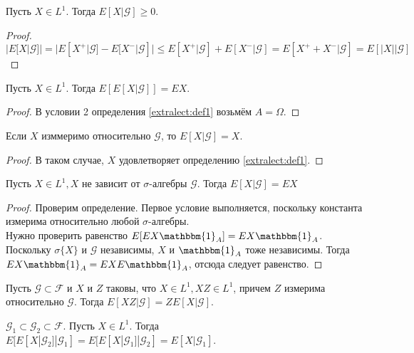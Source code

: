         \begin{lemma}
            Пусть $X\in L^1$. Тогда $E[X|\mathcal{G}]\ge0$.
        \end{lemma}
        \begin{proof}
           $|E[X|\mathcal{G}]| = |E[X^+|\mathcal{G}] - E[X^-|\mathcal{G}]|\leqslant E[X^+|\mathcal{G}] + E[X^-|\mathcal{G}] = E[X^+ + X^-|\mathcal{G}] = E[|X||\mathcal{G}]$
        \end{proof}

        \begin{lemma}
            Пусть $X\in L^1$. Тогда $E[E[X|\mathcal{G}]] = EX$.
        \end{lemma}
        \begin{proof}
           В условии 2 определения \ref{extralect:def1} возьмём $A=\Omega$.
        \end{proof}

        \begin{lemma}
            Если $X$ изммеримо относительно $\mathcal{G}$, то $E[X|\mathcal{G}]=X$.
        \end{lemma}
        \begin{proof}
           В таком случае, $X$ удовлетворяет определению \ref{extralect:def1}.
        \end{proof}

        \begin{lemma}
            Пусть $X\in L^1, X$ не зависит от $\sigma$-алгебры $\mathcal{G}$. Тогда $E[X|\mathcal{G}] = EX$
        \end{lemma}
        \begin{proof}
           Проверим определение. Первое условие выполняется, поскольку константа измерима относительно любой $\sigma$-алгебры.\\
           Нужно проверить равенство $E[EX\mathbbm{1}_{A}] = EX\mathbbm{1}_{A}$. Поскольку $\sigma\{X\}$ и $\mathcal{G}$ независимы, $X$ и $\mathbbm{1}_{A}$ тоже независимы.
           Тогда $EX\mathbbm{1}_{A} = EX E\mathbbm{1}_{A}$, отсюда следует равенство.
        \end{proof}

        \begin{lemma}
            Пусть $ \mathcal{G}\subset \mathcal{F}$ и $X$ и $Z$ таковы, что $X\in L^1, XZ \in L^1$, причем $Z$ измерима относительно $\mathcal{G}$. Тогда $E[XZ|\mathcal{G}] = Z E[X|\mathcal{G}]$.
        \end{lemma}

        \begin{lemma}
            $\mathcal{G}_1 \subset \mathcal{G}_2 \subset \mathcal{F}$. Пусть $X \in L^1$. Тогда $E[E[X|\mathcal{G}_2]|\mathcal{G}_1] = E[E[X|\mathcal{G}_1]|\mathcal{G}_2] = E[X|\mathcal{G}_1]$.
        \end{lemma}

